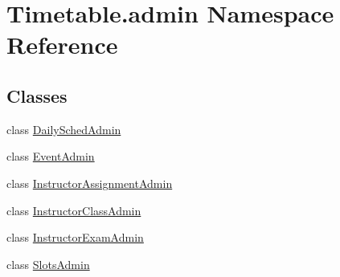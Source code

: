 \hypertarget{namespaceTimetable_1_1admin}{}\section{Timetable.\+admin Namespace Reference}
\label{namespaceTimetable_1_1admin}
\subsection*{Classes}
\begin{DoxyCompactItemize}
\item 
class \hyperlink{classTimetable_1_1admin_1_1DailySchedAdmin}{Daily\+Sched\+Admin}
\item 
class \hyperlink{classTimetable_1_1admin_1_1EventAdmin}{Event\+Admin}
\item 
class \hyperlink{classTimetable_1_1admin_1_1InstructorAssignmentAdmin}{Instructor\+Assignment\+Admin}
\item 
class \hyperlink{classTimetable_1_1admin_1_1InstructorClassAdmin}{Instructor\+Class\+Admin}
\item 
class \hyperlink{classTimetable_1_1admin_1_1InstructorExamAdmin}{Instructor\+Exam\+Admin}
\item 
class \hyperlink{classTimetable_1_1admin_1_1SlotsAdmin}{Slots\+Admin}
\end{DoxyCompactItemize}
